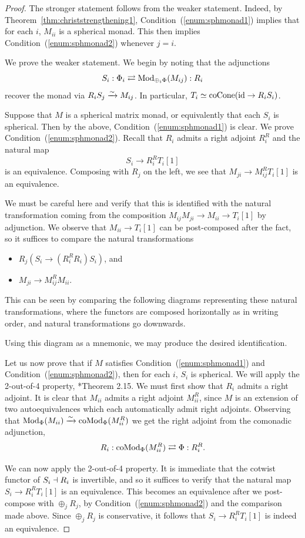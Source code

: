 \begin{proof}
    The stronger statement follows from the weaker statement. Indeed, by Theorem~\ref{thm:christstrengthening1}, Condition~(\ref{enum:sphmonad1}) implies that for each $i$, $M_{ii}$ is a spherical monad. This then implies Condition~(\ref{enum:sphmonad2}) whenever $j=i$.
    
    We prove the weaker statement. We begin by noting that the adjunctions
    \[S_i:\Phi_i\rightleftarrows\operatorname{Mod}_{\oplus_i\Phi}(M_{ij}):R_i\] 
    recover the monad via $R_iS_j\xrightarrow{\sim} M_{ij}$. In particular, $T_i \simeq \operatorname{coCone}(\operatorname{id}\to R_iS_i)$.

    Suppose that $M$ is a spherical matrix monad, or equivalently that each $S_i$ is spherical. Then by the above, Condition~(\ref{enum:sphmonad1}) is clear. We prove Condition~(\ref{enum:sphmonad2}). Recall that $R_i$ admits a right adjoint $R_i^R$ and the natural map
    \[S_i\to R^R_iT_i[1]\]
    is an equivalence. Composing with $R_j$ on the left, we see that $M_{ji}\to M_{ij}^RT_i[1]$ is an equivalence.
    
    We must be careful here and verify that this is identified with the natural transformation coming from the composition $M_{ij}M_{ji}\to M_{ii}\to T_i[1]$ by adjunction. We observe that $M_{ii}\to T_i[1]$ can be post-composed after the fact, so it suffices to compare the natural transformations
    \begin{itemize}
        \item $R_j(S_i\to (R_i^RR_i)S_i)$, and
        \item $M_{ji}\to M_{ij}^RM_{ii}$.
    \end{itemize}
    This can be seen by comparing the following diagrams representing these natural transformations, where the functors are composed horizontally as in writing order, and natural transformations go downwards.
    
    Using this diagram as a mnemonic, we may produce the desired identification.

    Let us now prove that if $M$ satisfies Condition~(\ref{enum:sphmonad1}) and Condition~(\ref{enum:sphmonad2}), then for each $i$, $S_i$ is spherical. We will apply the 2-out-of-4 property, \cite{christSphericalMonadicAdjunctions2023}*{Theorem 2.15}. We must first show that $R_i$ admits a right adjoint. It is clear that $M_{ii}$ admits a right adjoint $M_{ii}^R$, since $M$ is an extension of two autoequivalences which each automatically admit right adjoints. Observing that $\operatorname{Mod}_{\Phi}(M_{ii})\xrightarrow{\sim}\operatorname{coMod}_{\Phi}(M_{ii}^R)$ we get the right adjoint from the comonadic adjunction,
    \[R_i: \operatorname{coMod}_{\Phi}(M_{ii}^R)\rightleftarrows \Phi: R_i^R.\]
    
    We can now apply the 2-out-of-4 property. It is immediate that the cotwist functor of $S_i\dashv R_i$ is invertible, and so it suffices to verify that the natural map $S_i\to R_i^RT_i[1]$ is an equivalence. This becomes an equivalence after we post-compose with $\oplus_jR_j$, by Condition~(\ref{enum:sphmonad2}) and the comparison made above. Since $\oplus_jR_j$ is conservative, it follows that $S_i\to R_i^RT_i[1]$ is indeed an equivalence.
\end{proof}

